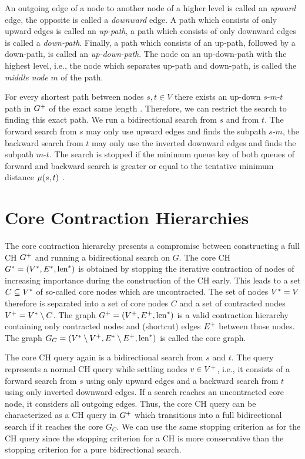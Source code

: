 An outgoing edge of a node to another node of a higher level is called an \emph{upward} edge, the opposite is called a \emph{downward} edge. A path which consists of only upward edges is called an \emph{up-path}, a path which consists of only downward edges is called a \emph{down-path}. Finally, a path which consists of an up-path, followed by a down-path, is called an \emph{up-down-path}. The node on an up-down-path with the highest level, i.e., the node which separates up-path and down-path, is called the \emph{middle node} $m$ of the path.

For every shortest path between nodes $s,t \in V$ there exists an up-down $s$-$m$-$t$ path in $G^+$ of the exact same length \cite{geisberger:2012}. Therefore, we can restrict the search to finding this exact path. We run a bidirectional search from $s$ and from $t$. The forward search from $s$ may only use upward edges and finds the subpath $s$-$m$, the backward search from $t$ may only use the inverted downward edges and finds the subpath $m$-$t$. The search is stopped if the minimum queue key of both queues of forward and backward search is greater or equal to the tentative minimum distance $\mu(s,t)$ \cite{geisberger:2012}.


\section{Core Contraction Hierarchies\label{sec:core_ch}}
The core contraction hierarchy presents a compromise between constructing a full CH $G^+$ and running a bidirectional search on $G$. The core CH $G^* = (V^*,E^*,\operatorname{len}^*)$ is obtained by stopping the iterative contraction of nodes of increasing importance during the construction of the CH early. This leads to a set $C \subseteq V^*$ of so-called core nodes which are uncontracted. The set of nodes $V^* = V$ therefore is separated into a set of core nodes $C$ and a set of contracted nodes $V^+ = V^* \setminus C$. The graph $G^+ = (V^+,E^+,\operatorname{len}^*)$ is a valid contraction hierarchy containing only contracted nodes and (shortcut) edges $E^+$ between those nodes. The graph $G_{C} = (V^* \setminus V^+, E^* \setminus E^+,\operatorname{len}^*)$ is called the core graph.

The core CH query again is a bidirectional search from $s$ and $t$. The query represents a normal CH query while settling nodes $v \in V^+$, i.e., it consists of a forward search from $s$ using only upward edges and a backward search from $t$ using only inverted downward edges. If a search reaches an uncontracted core node, it considers all outgoing edges. Thus, the core CH query can be characterized as a CH query in $G^+$ which transitions into a full bidirectional search if it reaches the core $G_C$. We can use the same stopping criterion as for the CH query since the stopping criterion for a CH is more conservative than the stopping criterion for a pure bidirectional search.


